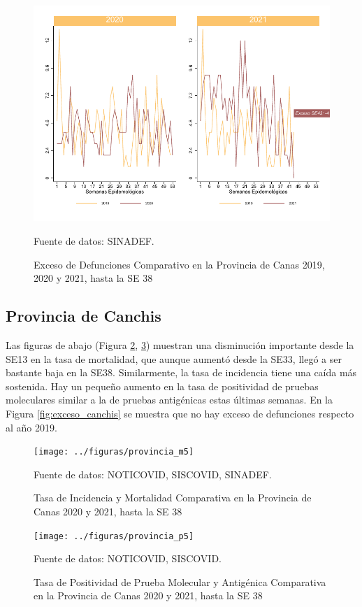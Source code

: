 \documentclass[12pt,a4paper,openany]{book}
\begin{document}
	\begin{figure}[h]
	\caption{Exceso de Defunciones Comparativo en la Provincia de Canas 2019, 2020 y 2021, hasta la SE 38}\label{fig:exceso_calca}
	\begin{center}
		\includegraphics[width=0.7\linewidth]{../figuras/exceso_4}
	\end{center}
	{\footnotesize {Fuente de datos: SINADEF.}}
	\end{figure}

\clearpage

	\subsection*{Provincia de Canchis}
	\noindent Las figuras de abajo (Figura \ref{fig:inc_mort_canchis}, \ref{fig:positividad_canchis})  muestran una disminución importante desde la SE13 en la tasa de mortalidad, que aunque aumentó desde la SE33, llegó a ser bastante baja en la SE38. Similarmente, la tasa de incidencia tiene una caída más sostenida. Hay un pequeño aumento en la tasa de positividad de pruebas moleculares similar a la de pruebas antigénicas estas últimas semanas. En la Figura \ref{fig:exceso_canchis} se muestra que no hay exceso de defunciones respecto al año 2019.

	\begin{figure}[h]
	\caption{Tasa de Incidencia y Mortalidad Comparativa en la Provincia de Canas 2020 y 2021, hasta la SE 38}\label{fig:inc_mort_canchis}
	\begin{center}
		\texttt{[image: ../figuras/provincia\_m5]}
	\end{center}
	{\footnotesize {Fuente de datos: NOTICOVID, SISCOVID, SINADEF.}}
	\end{figure}

	\begin{figure}[h]
	\caption{Tasa de Positividad de Prueba Molecular y Antigénica Comparativa en la Provincia de Canas 2020 y 2021, hasta la SE 38}\label{fig:positividad_canchis}
	\begin{center}
		\texttt{[image: ../figuras/provincia\_p5]}
	\end{center}
	{\footnotesize {Fuente de datos: NOTICOVID, SISCOVID.}}
	\end{figure}
	
\end{document}
